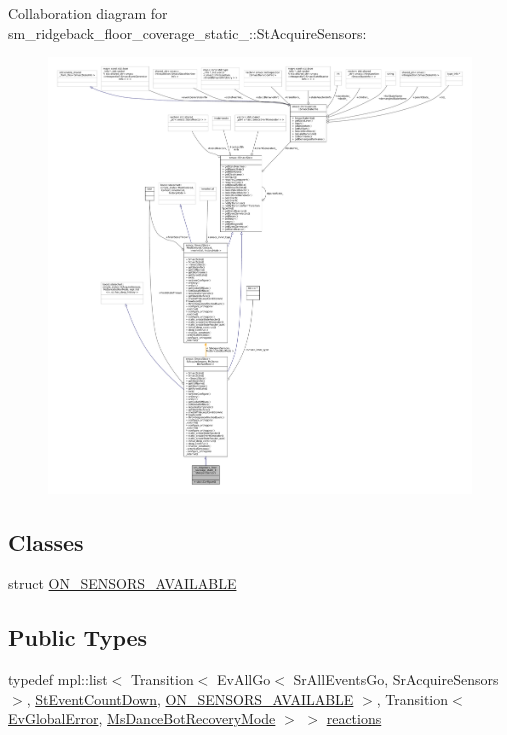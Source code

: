 Collaboration diagram for sm\+\_\+ridgeback\+\_\+floor\+\_\+coverage\+\_\+static\+\_\+:\+:St\+Acquire\+Sensors\+:
\nopagebreak
\begin{figure}[H]
\begin{center}
\leavevmode
\includegraphics[width=350pt]{structsm__ridgeback__floor__coverage__static__1_1_1StAcquireSensors__coll__graph}
\end{center}
\end{figure}
\subsection*{Classes}
\begin{DoxyCompactItemize}
\item 
struct \hyperlink{structsm__ridgeback__floor__coverage__static__1_1_1StAcquireSensors_1_1ON__SENSORS__AVAILABLE}{O\+N\+\_\+\+S\+E\+N\+S\+O\+R\+S\+\_\+\+A\+V\+A\+I\+L\+A\+B\+LE}
\end{DoxyCompactItemize}
\subsection*{Public Types}
\begin{DoxyCompactItemize}
\item 
typedef mpl\+::list$<$ Transition$<$ Ev\+All\+Go$<$ Sr\+All\+Events\+Go, Sr\+Acquire\+Sensors $>$, \hyperlink{structsm__ridgeback__floor__coverage__static__1_1_1StEventCountDown}{St\+Event\+Count\+Down}, \hyperlink{structsm__ridgeback__floor__coverage__static__1_1_1StAcquireSensors_1_1ON__SENSORS__AVAILABLE}{O\+N\+\_\+\+S\+E\+N\+S\+O\+R\+S\+\_\+\+A\+V\+A\+I\+L\+A\+B\+LE} $>$, Transition$<$ \hyperlink{structsm__ridgeback__floor__coverage__static__1_1_1EvGlobalError}{Ev\+Global\+Error}, \hyperlink{classsm__ridgeback__floor__coverage__static__1_1_1MsDanceBotRecoveryMode}{Ms\+Dance\+Bot\+Recovery\+Mode} $>$ $>$ \hyperlink{structsm__ridgeback__floor__coverage__static__1_1_1StAcquireSensors_a0a9c15010f74294f943d5c7e427525d3}{reactions}
\end{DoxyCompactItemize}
